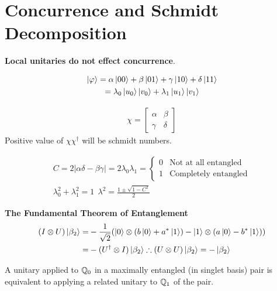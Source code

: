 \documentclass[10pt, a4paper, reprint, amsmath,amssymb, aps]{revtex4-2}
\begin{document}
\section{Concurrence and Schmidt Decomposition}
    \textbf{Local unitaries do not effect concurrence}.
    \begin{minipage}{\linewidth}
    \begin{minipage}{0.49\linewidth}
        \begin{gather*} 
            \ket{\varphi} = \alpha\ket{00} + \beta\ket{01} + \gamma\ket{10} + \delta\ket{11} \\
            = \lambda_0\ket{u_0}\ket{v_0} + \lambda_1\ket{u_1}\ket{v_1}
        \end{gather*}
    \end{minipage}
    \begin{minipage}{0.49\linewidth}
        \begin{gather*}
            \chi = \begin{bmatrix}
                \alpha & \beta \\ \gamma & \delta
            \end{bmatrix}
        \end{gather*}
        Positive value of $\chi\chi^\dagger$ will be schmidt numbers.
    \end{minipage}
    \end{minipage}
        \begin{gather*}
            C = 2|\alpha\delta - \beta\gamma| = 2\lambda_0\lambda_1 = \begin{cases}0 & \text{Not at all entangled}\\1 & \text{Completely entangled}\end{cases} \\
            \lambda_0^2 + \lambda_1^2 = 1 \ \ \lambda^2 = \frac{1\pm\sqrt{1-C^2}}{2}
        \end{gather*}
        \begin{theorem} \textbf{The Fundamental Theorem of Entanglement}
            \begin{align*}
                (I\otimes U)\ket{\beta_2} =& -\frac{1}{\sqrt{2}} (\ket{0}\otimes(b\ket{0}+a^*\ket{1})
                -\ket{1}\otimes(a\ket{0}-b^*\ket{1})) \\
                =& -(U^\dagger\otimes I )\ket{\beta_2} 
                \therefore (U\otimes U)\ket{\beta_2} = -\ket{\beta_2}
            \end{align*}

            A unitary applied to $\mathbb{Q}_0$ in a maximally entangled (in singlet basis) pair is equivalent to applying a related unitary to $\mathbb{Q}_1$ of the pair.

        \end{theorem}
\end{document}
